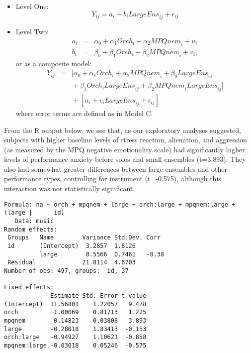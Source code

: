 \documentclass[
]{krantz}
\begin{document}
\begin{itemize}
\item
  Level One:
  \begin{equation}
  Y_{ij} = a_{i}+b_{i}\textstyle{LargeEns}_{ij}+\epsilon_{ij}
  \label{eq:level1modelcnegem}
  \end{equation}
\item
  Level Two:
  \begin{eqnarray*}
  a_{i} & = & \alpha_{0}+\alpha_{1}\textstyle{Orch}_{i}+\alpha_{2}\textstyle{MPQnem}_{i}+u_{i} \\
  b_{i} & = & \beta_{0}+\beta_{1}\textstyle{Orch}_{i}+\beta_{2}\textstyle{MPQnem}_{i}+v_{i},
  \end{eqnarray*}
  or as a composite model:
  \begin{eqnarray*}
  Y_{ij} & = & [\alpha_{0}+\alpha_{1}\textstyle{Orch}_{i}+\alpha_{2}\textstyle{MPQnem}_{i}+\beta_{0}\textstyle{LargeEns}_{ij} \\
   & & \textrm{} + \beta_{1}\textstyle{Orch}_{i}\textstyle{LargeEns}_{ij}+\beta_{2}\textstyle{MPQnem}_{i}\textstyle{LargeEns}_{ij}] \\
   & & \textrm{} + [u_{i}+v_{i}\textstyle{LargeEns}_{ij}+\epsilon_{ij}]
  \end{eqnarray*}
  where error terms are defined as in Model C.
\end{itemize}

From the R output below, we see that, as our exploratory analyses suggested, subjects with higher baseline levels of stress reaction, alienation, and aggression (as measured by the MPQ negative emotionality scale) had significantly higher levels of performance anxiety before solos and small ensembles (t=3.893). They also had somewhat greater differences between large ensembles and other performance types, controlling for instrument (t=-0.575), although this interaction was not statistically significant.

\begin{verbatim}
Formula: na ~ orch + mpqnem + large + orch:large + mpqnem:large + (large |      id)
   Data: music
Random effects:
 Groups   Name        Variance Std.Dev. Corr 
 id       (Intercept)  3.2857  1.8126        
          large        0.5566  0.7461   -0.38
 Residual             21.8114  4.6703        
Number of obs: 497, groups:  id, 37

Fixed effects:
             Estimate Std. Error t value
(Intercept)  11.56801    1.22057   9.478
orch          1.00069    0.81713   1.225
mpqnem        0.14823    0.03808   3.893
large        -0.28018    1.83413  -0.153
orch:large   -0.94927    1.10621  -0.858
mpqnem:large -0.03018    0.05246  -0.575
\end{verbatim}
\end{document}
